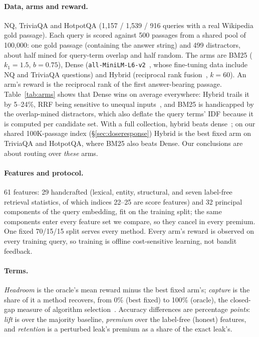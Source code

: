 \documentclass{article}
\begin{document}
\paragraph{Data, arms and reward.} NQ, TriviaQA and HotpotQA (1{,}157 / 1{,}539 / 916 queries with
a real Wikipedia gold passage). Each query is scored against 500 passages from a shared pool of
100{,}000: one gold passage (containing the answer string) and 499 distractors, about half mined
for query-term overlap and half random. The arms are BM25 ($k_1{=}1.5$, $b{=}0.75$), Dense
(\texttt{all-MiniLM-L6-v2}~\cite{reimers2019sentence}, whose fine-tuning data include NQ and
TriviaQA questions) and Hybrid (reciprocal rank fusion~\cite{cormack2009rrf}, $k{=}60$). An
arm's reward is the reciprocal rank of the first answer-bearing passage. Table~\ref{tab:arms}
shows that Dense wins on average everywhere: Hybrid trails it by 5--24\%, RRF being sensitive to
unequal inputs~\cite{bruch2023fusion,benham2017riskreward}, and BM25 is handicapped by the
overlap-mined distractors, which also deflate the query terms' IDF because it is computed per
candidate set. With a full collection, hybrid beats dense~\cite{ma2021replication}; on our shared
100K-passage index (\S\ref{sec:doseresponse}) Hybrid is the best fixed arm on TriviaQA and
HotpotQA, where BM25 also beats Dense. Our conclusions are about routing over \emph{these} arms.

\paragraph{Features and protocol.} 61 features: 29 handcrafted (lexical, entity, structural, and
seven label-free retrieval statistics, of which indices 22--25 are score features) and 32
principal components of the query embedding, fit on the training split; the same components
enter every feature set we compare, so they cancel in every premium. One fixed 70/15/15 split
serves every method. Every
arm's reward is observed on every training query, so training is offline cost-sensitive
learning, not bandit feedback.

\paragraph{Terms.} \emph{Headroom} is the oracle's mean reward minus the best fixed arm's;
\emph{capture} is the share of it a method recovers, from 0\% (best fixed) to 100\% (oracle), the
closed-gap measure of algorithm selection~\cite{lindauer2019ascompetitions}. Accuracy differences
are percentage \emph{points}: \emph{lift} is over the majority baseline, \emph{premium} over the
label-free (honest) features, and \emph{retention} is a perturbed leak's premium as a share of the
exact leak's.
\end{document}

